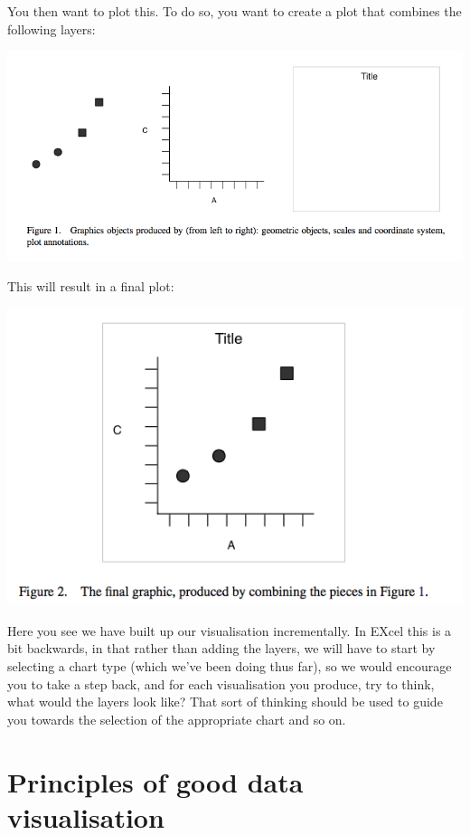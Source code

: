 \documentclass[
]{book}
\begin{document}
You then want to plot this. To do so, you want to create a plot that combines the following layers:

\includegraphics{imgs/layers.png}

This will result in a final plot:

\includegraphics{imgs/combined.png}

Here you see we have built up our visualisation incrementally. In EXcel this is a bit backwards, in that rather than adding the layers, we will have to start by selecting a chart type (which we've been doing thus far), so we would encourage you to take a step back, and for each visualisation you produce, try to think, what would the layers look like? That sort of thinking should be used to guide you towards the selection of the appropriate chart and so on.

\hypertarget{principles-of-good-data-visualisation}{%
\section{Principles of good data visualisation}\label{principles-of-good-data-visualisation}}
\end{document}
